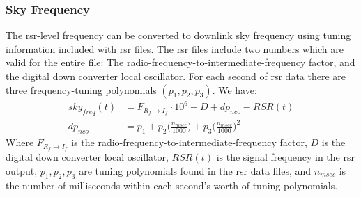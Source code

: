 \documentclass{article}
\begin{document}
            \subsubsection{\footnotesize Sky Frequency}
                The \gls{rsr}-level \gls{frequency} can be
                converted to \gls{downlink} \gls{sky frequency}
                using tuning information included with \gls{rsr}
                files. The \gls{rsr} files include two numbers
                which are valid for the entire file: The
                radio-frequency-to-intermediate-frequency factor,
                and the digital down converter local oscillator.
                For each second of \gls{rsr} data there are
                three \glspl{frequency-tuning polynomial}
                $(p_{1},p_{2},p_{3})$. We have:
                \begin{align}
                    sky_{freq}(t)
                    &=F_{R_{f}\rightarrow{I_{f}}}\cdot 10^{6}
                     +D+dp_{nco}-RSR(t)
                    \label{equ:usr_sky_freq_t}\\
                    dp_{nco}
                    &=p_1
                     +p_2\bigg(\frac{n_{msec}}{1000}\bigg)
                     +p_3\bigg(\frac{n_{msec}}{1000}\bigg)^{2}
                    \label{equ:usr_dp_nco}
                \end{align}
                Where $F_{R_{f}\rightarrow I_{f}}$ is the
                radio-frequency-to-intermediate-frequency factor,
                $D$ is the digital down converter local oscillator,
                $RSR(t)$ is the signal frequency in the \gls{rsr}
                output, $p_1,p_2,p_3$ are tuning polynomials
                found in the \gls{rsr} data files, and $n_{msec}$
                is the number of milliseconds within each
                second's worth of tuning polynomials. 
\end{document}
